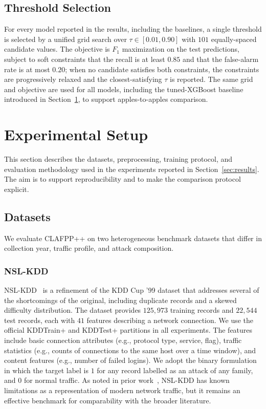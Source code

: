\documentclass[pdflatex,sn-mathphys-num]{sn-jnl}
\theoremstyle{thmstyleone}
\theoremstyle{thmstyletwo}
\theoremstyle{thmstylethree}
\begin{document}
\subsection{Threshold Selection}\label{sec:method-threshold}

For every model reported in the results, including the baselines, a single threshold is selected by a unified grid search over $\tau \in [0.01, 0.90]$ with $101$ equally-spaced candidate values. The objective is $F_1$ maximization on the test predictions, subject to soft constraints that the recall is at least $0.85$ and that the false-alarm rate is at most $0.20$; when no candidate satisfies both constraints, the constraints are progressively relaxed and the closest-satisfying $\tau$ is reported. The same grid and objective are used for all models, including the tuned-XGBoost baseline introduced in Section~\ref{sec:setup}, to support apples-to-apples comparison.

\section{Experimental Setup}\label{sec:setup}

This section describes the datasets, preprocessing, training protocol, and evaluation methodology used in the experiments reported in Section~\ref{sec:results}. The aim is to support reproducibility and to make the comparison protocol explicit.

\subsection{Datasets}\label{sec:setup-datasets}

We evaluate CLAFPP++ on two heterogeneous benchmark datasets that differ in collection year, traffic profile, and attack composition.

\subsubsection{NSL-KDD}
NSL-KDD~\cite{tavallaee2009detailed} is a refinement of the KDD Cup '99 dataset that addresses several of the shortcomings of the original, including duplicate records and a skewed difficulty distribution. The dataset provides $125{,}973$ training records and $22{,}544$ test records, each with $41$ features describing a network connection. We use the official KDDTrain+ and KDDTest+ partitions in all experiments. The features include basic connection attributes (e.g., protocol type, service, flag), traffic statistics (e.g., counts of connections to the same host over a time window), and content features (e.g., number of failed logins). We adopt the binary formulation in which the target label is $1$ for any record labelled as an attack of any family, and $0$ for normal traffic. As noted in prior work~\cite{shone2017deep,gurung2019deep}, NSL-KDD has known limitations as a representation of modern network traffic, but it remains an effective benchmark for comparability with the broader literature.
\end{document}
